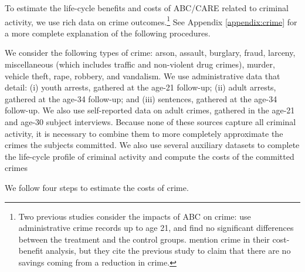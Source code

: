 To estimate the life-cycle benefits and costs of ABC/CARE related to criminal activity, we use rich data on crime outcomes.\footnote{Two previous studies consider the impacts of ABC on crime: \citet{Clarke_Campbell_1998_ABC_Comparison_ECRQ} use administrative crime records up to age 21, and find no significant differences between the treatment and the control groups. \cite{Barnett_Masse_2007_EER} mention crime in their cost-benefit analysis, but they cite the previous study to claim that there are no savings coming from a reduction in crime.} See Appendix \ref{appendix:crime} for a more complete explanation of the following procedures.

We consider the following types of crime: arson, assault, burglary, fraud, larceny, miscellaneous (which includes traffic and non-violent drug crimes), murder, vehicle theft, rape, robbery, and vandalism. We use administrative data that detail: (i) youth arrests, gathered at the age-21 follow-up; (ii) adult arrests, gathered at the age-34 follow-up; and (iii) sentences, gathered at the age-34 follow-up. We also use self-reported data on adult crimes, gathered in the age-21 and age-30 subject interviews. Because none of these sources capture all criminal activity, it is necessary to combine them to more completely approximate the crimes the subjects committed. We also use several auxiliary datasets to complete the life-cycle profile of criminal activity and compute the costs of the committed crimes

We follow four steps to estimate the costs of crime. 

